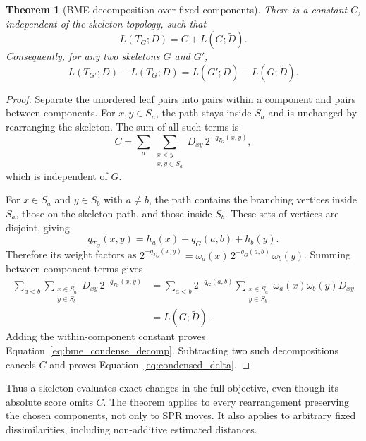 \documentclass[11pt,a4paper]{article}
\makeatletter
\DeclareRobustCommand{\_}{\ifmmode\nfss@text{\textunderscore}\else\textunderscore\allowbreak\fi}
\newtheorem{theorem}{Theorem}[section]
\theoremstyle{definition}
\makeatother
\begin{document}
\begin{theorem}[BME decomposition over fixed components]
\label{thm:clade_condense}
There is a constant $C$, independent of the skeleton topology, such that
\begin{equation}
 L(T_G;D)=C+L(G;\widetilde D).
 \label{eq:bme_condense_decomp}
\end{equation}
Consequently, for any two skeletons $G$ and $G'$,
\begin{equation}
 L(T_{G'};D)-L(T_G;D)
 =L(G';\widetilde D)-L(G;\widetilde D).
 \label{eq:condensed_delta}
\end{equation}
\end{theorem}
\begin{proof}
Separate the unordered leaf pairs into pairs within a component and pairs between components.
For $x,y\in S_a$, the path stays inside $S_a$ and is unchanged by rearranging the skeleton.
The sum of all such terms is
\[
 C=\sum_a\sum_{\substack{x<y\\x,y\in S_a}}
      D_{xy}\,2^{-q_{T_G}(x,y)},
\]
which is independent of $G$.

For $x\in S_a$ and $y\in S_b$ with $a\ne b$, the path contains the branching vertices inside $S_a$, those on the skeleton path, and those inside $S_b$.
These sets of vertices are disjoint, giving
\[
 q_{T_G}(x,y)=h_a(x)+q_G(a,b)+h_b(y).
\]
Therefore its weight factors as
$2^{-q_{T_G}(x,y)}=\omega_a(x)\,2^{-q_G(a,b)}\,\omega_b(y)$.
Summing between-component terms gives
\begin{align*}
 \sum_{a<b}\sum_{\substack{x\in S_a\\y\in S_b}}
 D_{xy}\,2^{-q_{T_G}(x,y)}
 &=\sum_{a<b}2^{-q_G(a,b)}
      \sum_{\substack{x\in S_a\\y\in S_b}}\omega_a(x)\omega_b(y)D_{xy}\\
 &=L(G;\widetilde D).
\end{align*}
Adding the within-component constant proves Equation~\eqref{eq:bme_condense_decomp}.
Subtracting two such decompositions cancels $C$ and proves Equation~\eqref{eq:condensed_delta}.
\end{proof}

Thus a skeleton evaluates exact changes in the full objective, even though its absolute score omits $C$.
The theorem applies to every rearrangement preserving the chosen components, not only to SPR moves.
It also applies to arbitrary fixed dissimilarities, including non-additive estimated distances.
\end{document}
